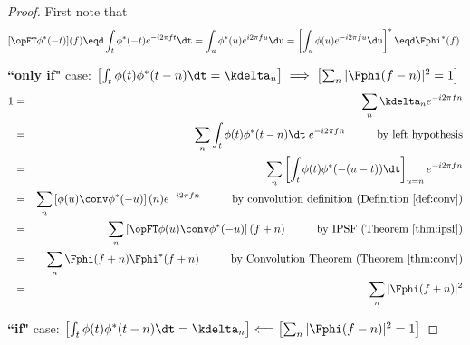 \begin{proof}
First note that 
\[ [\opFT\phi^\ast(-t)](f) 
   \eqd \int_t \phi^\ast(-t) e^{-i2\pi ft}\dt
   =    \int_u \phi^\ast(u) e^{i2\pi fu}\du 
   =    \left[ \int_u \phi(u) e^{-i2\pi fu}\du \right]^\ast
   \eqd \Fphi^\ast(f).
\]

{\bf ``only if"} case: 
$\left[\int_t \phi(t) \phi^\ast(t-n) \dt =\kdelta_n\right] \implies
  \left[\sum_n | \Fphi(f-n)|^2 = 1 \right]$
\begin{eqnarray*}
  1 &=& \sum_n \kdelta_n e^{-i2\pi fn}
  \\&=& \sum_n \int_t \phi(t)\phi^\ast(t-n) \dt \;e^{-i2\pi fn}
        \hspace{1cm}\mbox{by left hypothesis}
  \\&=& \sum_n \left[ \int_t \phi(t)\phi^\ast(-(u-t))\dt \right]_{u=n} e^{-i2\pi fn}
  \\&=& \sum_n \left[ \phi(u) \conv \phi^\ast(-u)\right](n) e^{-i2\pi fn}
        \hspace{1cm}\mbox{by convolution definition (Definition~\ref{def:conv})}
  \\&=& \sum_n \left[\opFT \phi(u) \conv \phi^\ast(-u)\right](f+n) 
        \hspace{1cm}\mbox{by IPSF (Theorem~\ref{thm:ipsf})}
  \\&=& \sum_n \Fphi(f+n) \Fphi^\ast(f+n)
        \hspace{1cm}\mbox{by Convolution Theorem (Theorem~\ref{thm:conv})}
  \\&=& \sum_n |\Fphi(f+n)|^2
\end{eqnarray*}

{\bf ``if"} case: 
$\left[\int_t \phi(t) \phi^\ast(t-n) \dt =\kdelta_n\right] \Longleftarrow
  \left[\sum_n | \Fphi(f-n)|^2 = 1 \right]$


\end{proof}

